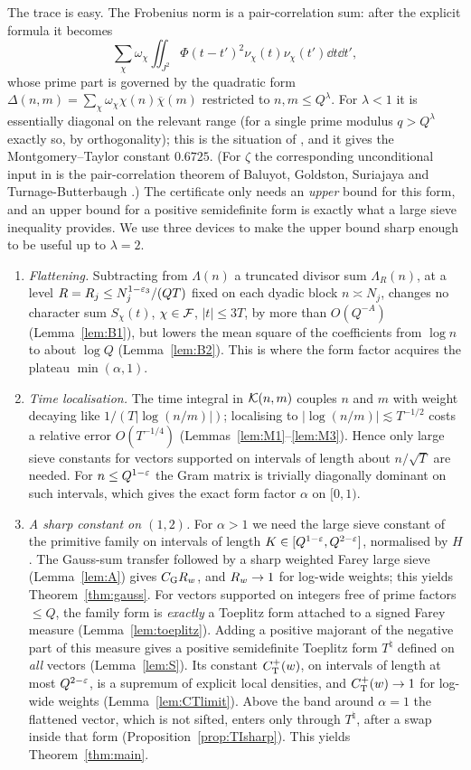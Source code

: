 \documentclass[11pt]{amsart}
\theoremstyle{definition}
\theoremstyle{remark}
\numberwithin{equation}{section}
\begin{document}
The trace is easy. The Frobenius norm is a pair-correlation sum: after the explicit formula it becomes
\[
\sum_{\chi}\omega_\chi\iint_{J^2}\Phi(t-t')^2\nu_\chi(t)\nu_\chi(t')\dd t\dd t',
\]
whose prime part is governed by the quadratic form $\Delta(n,m)=\sum_\chi\omega_\chi\chi(n)\overline{\chi}(m)$ restricted to $n,m\le Q^{\lambda}$. For $\lambda<1$ it is essentially diagonal on the relevant range (for a single prime modulus $q>Q^\lambda$ exactly so, by orthogonality); this is the situation of \cite{AF26,HY26}, and it gives the Montgomery--Taylor constant $0.6725$. (For $\zeta$ the corresponding unconditional input in \cite{AF26,Lam26} is the pair-correlation theorem of Baluyot, Goldston, Suriajaya and Turnage-Butterbaugh \cite{BGSTB24}.) The certificate only needs an \emph{upper} bound for this form, and an upper bound for a positive semidefinite form is exactly what a large sieve inequality provides. We use three devices to make the upper bound sharp enough to be useful up to $\lambda=2$.
\begin{enumerate}[label=(\roman*),leftmargin=*]
\item \emph{Flattening.} Subtracting from $\Lambda(n)$ a truncated divisor sum $\Lambda_R(n)$, at a level $R=R_j\le N_j^{1-\varepsilon_3}/(QT)$ fixed on each dyadic block $n\asymp N_j$, changes no character sum $S_\chi(t)$, $\chi\in\mathcal F$, $|t|\le3T$, by more than $O(Q^{-A})$ (Lemma~\ref{lem:B1}), but lowers the mean square of the coefficients from $\log n$ to about $\log Q$ (Lemma~\ref{lem:B2}). This is where the form factor acquires the plateau $\min(\alpha,1)$.
\item \emph{Time localisation.} The time integral in $\mathcal K(n,m)$ couples $n$ and $m$ with weight decaying like $1/(T|\log(n/m)|)$; localising to $|\log(n/m)|\lesssim T^{-1/2}$ costs a relative error $O(T^{-1/4})$ (Lemmas~\ref{lem:M1}--\ref{lem:M3}). Hence only large sieve constants for vectors supported on intervals of length about $n/\sqrt T$ are needed. For $n\le Q^{1-\varepsilon}$ the Gram matrix is trivially diagonally dominant on such intervals, which gives the exact form factor $\alpha$ on $[0,1)$.
\item \emph{A sharp constant on $(1,2)$.} For $\alpha>1$ we need the large sieve constant of the primitive family on intervals of length $K\in[Q^{1-\varepsilon},Q^{2-\varepsilon}]$, normalised by $H$. The Gauss-sum transfer followed by a sharp weighted Farey large sieve (Lemma~\ref{lem:A}) gives $C_{\mathrm G}R_w$, and $R_w\to1$ for log-wide weights; this yields Theorem~\ref{thm:gauss}. For vectors supported on integers free of prime factors $\le Q$, the family form is \emph{exactly} a Toeplitz form attached to a signed Farey measure (Lemma~\ref{lem:toeplitz}). Adding a positive majorant of the negative part of this measure gives a positive semidefinite Toeplitz form $T^\natural$ defined on \emph{all} vectors (Lemma~\ref{lem:S}). Its constant $C^{+}_{\mathrm T}(w)$, on intervals of length at most $Q^{2-\varepsilon}$, is a supremum of explicit local densities, and $C^{+}_{\mathrm T}(w)\to1$ for log-wide weights (Lemma~\ref{lem:CTlimit}). Above the band around $\alpha=1$ the flattened vector, which is not sifted, enters only through $T^\natural$, after a swap inside that form (Proposition~\ref{prop:TIsharp}). This yields Theorem~\ref{thm:main}.
\end{enumerate}
\end{document}
